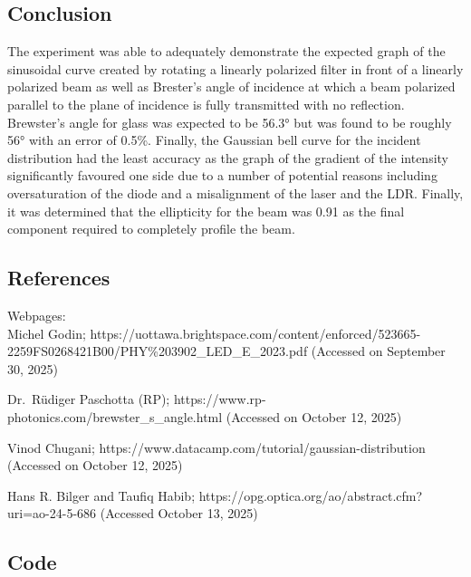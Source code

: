 \documentclass[11pt]{article}
\begin{document}
    \hypertarget{conclusion}{%
\subsection{Conclusion}\label{conclusion}}

    The experiment was able to adequately demonstrate the expected graph of
the sinusoidal curve created by rotating a linearly polarized filter in
front of a linearly polarized beam as well as Brester's angle of
incidence at which a beam polarized parallel to the plane of incidence
is fully transmitted with no reflection. Brewster's angle for glass was
expected to be 56.3° but was found to be roughly 56° with an error of
0.5\%. Finally, the Gaussian bell curve for the incident distribution
had the least accuracy as the graph of the gradient of the intensity
significantly favoured one side due to a number of potential reasons
including oversaturation of the diode and a misalignment of the laser
and the LDR. Finally, it was determined that the ellipticity for the
beam was 0.91 as the final component required to completely profile the
beam.

    \hypertarget{references}{%
\subsection{References}\label{references}}

    Webpages: \\
Michel Godin;
https://uottawa.brightspace.com/content/enforced/523665-2259FS0268421B00/PHY\%203902\_LED\_E\_2023.pdf
(Accessed on September 30, 2025)

Dr.~Rüdiger Paschotta (RP);
https://www.rp-photonics.com/brewster\_s\_angle.html (Accessed on
October 12, 2025)

Vinod Chugani; https://www.datacamp.com/tutorial/gaussian-distribution
(Accessed on October 12, 2025)

Hans R. Bilger and Taufiq Habib;
https://opg.optica.org/ao/abstract.cfm?uri=ao-24-5-686 (Accessed October
13, 2025)

    \hypertarget{code}{%
\subsection{Code}\label{code}}


    
    
    
\end{document}
